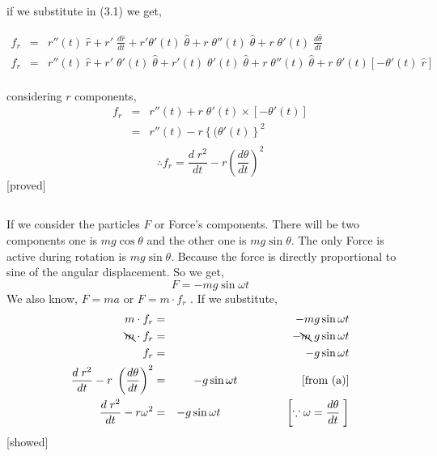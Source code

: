 \documentclass{article}
\begin{document}
{    if we substitute in (3.1) we get,

    \begin{eqnarray*}
        f_r &=& r''(t)\;\hat{r} + r'\;\frac{d\hat{r}}{dt} + r'\theta'(t)\;\hat{\theta} + r\;\theta''(t)\;\hat{\theta}+r\;\theta'(t) \;\frac{d\hat{\theta}}{dt}\\
        f_r &=& r''(t)\;\hat{r} + r'\;\theta'(t)\;\hat{\theta} + r'(t)\;\theta'(t)\;\hat{\theta} + r\;\theta''(t)\;\hat{\theta}+r\;\theta'(t)\left[-\theta'(t)\;\hat{r}\right]\\
    \end{eqnarray*}

    considering $r$ components,
    \begin{eqnarray*}
        f_r &=& r''(t) + r\;\theta'(t)\times[-\theta'(t)]\\
            &=& r''(t) - r\left\{(\theta'(t)\right\}^2\\
    \end{eqnarray*}
    $$\therefore f_r = \frac{d\;r^2}{dt} - r\left(\frac{d\theta}{dt}\right)^2$$
    \hspace{10cm}[proved]


}


\newpage

\subsection{}%
\large{
If we consider the particles $F$ or Force's components. There will be two components one is $mg\cos\theta$ and the other one is $mg\sin\theta$. The only Force is active during rotation is $mg\sin\theta$. Because the force is directly proportional to sine of the angular displacement. So we get,
$$F = -mg\sin{\omega t}$$
We also know, $F=ma$ or $F=m\cdot f_r$ . If we substitute,
\begin{eqnarray*}
    m\cdot f_r &=& -mg\sin{\omega t}\\
    \bcancel{m}\cdot f_r &=& -\bcancel{m}\;g\sin{\omega t}\\
    f_r &=& -g\sin{\omega t}\\
    \frac{d\;r^2}{dt} - r\;\left(\frac{d\theta}{dt}\right)^2 &=& -g\sin{\omega t}\hspace{2cm}\text{[from (a)]}\\
    \frac{d\;r^2}{dt} - r\omega^2 &=& -g\sin{\omega t} \hspace{2cm}\left[\because \omega = \frac{d\theta}{dt}\;\right]
\end{eqnarray*}
}
\hspace{8cm}[showed]
\end{document}
